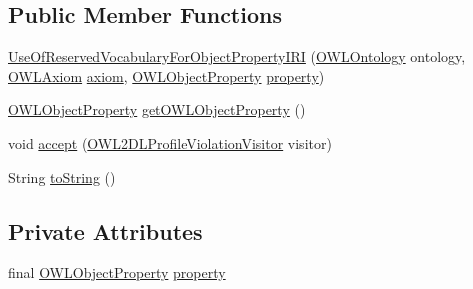 \subsection*{Public Member Functions}
\begin{DoxyCompactItemize}
\item 
\hyperlink{classorg_1_1semanticweb_1_1owlapi_1_1profiles_1_1_use_of_reserved_vocabulary_for_object_property_i_r_i_a142f91be66796a2785c34ff4a4d5ddae}{Use\-Of\-Reserved\-Vocabulary\-For\-Object\-Property\-I\-R\-I} (\hyperlink{interfaceorg_1_1semanticweb_1_1owlapi_1_1model_1_1_o_w_l_ontology}{O\-W\-L\-Ontology} ontology, \hyperlink{interfaceorg_1_1semanticweb_1_1owlapi_1_1model_1_1_o_w_l_axiom}{O\-W\-L\-Axiom} \hyperlink{classorg_1_1semanticweb_1_1owlapi_1_1profiles_1_1_o_w_l_profile_violation_aa7c8e8910ed3966f64a2c003fb516214}{axiom}, \hyperlink{interfaceorg_1_1semanticweb_1_1owlapi_1_1model_1_1_o_w_l_object_property}{O\-W\-L\-Object\-Property} \hyperlink{classorg_1_1semanticweb_1_1owlapi_1_1profiles_1_1_use_of_reserved_vocabulary_for_object_property_i_r_i_ab4e3f4edca6000d809a14ff228c35da3}{property})
\item 
\hyperlink{interfaceorg_1_1semanticweb_1_1owlapi_1_1model_1_1_o_w_l_object_property}{O\-W\-L\-Object\-Property} \hyperlink{classorg_1_1semanticweb_1_1owlapi_1_1profiles_1_1_use_of_reserved_vocabulary_for_object_property_i_r_i_a0669eaa5c277e16a22626f40a26e5ce5}{get\-O\-W\-L\-Object\-Property} ()
\item 
void \hyperlink{classorg_1_1semanticweb_1_1owlapi_1_1profiles_1_1_use_of_reserved_vocabulary_for_object_property_i_r_i_a1119bc8b1d2b8e054648028f2c848993}{accept} (\hyperlink{interfaceorg_1_1semanticweb_1_1owlapi_1_1profiles_1_1_o_w_l2_d_l_profile_violation_visitor}{O\-W\-L2\-D\-L\-Profile\-Violation\-Visitor} visitor)
\item 
String \hyperlink{classorg_1_1semanticweb_1_1owlapi_1_1profiles_1_1_use_of_reserved_vocabulary_for_object_property_i_r_i_aead1554c0721c69ae8e23ddaf615d736}{to\-String} ()
\end{DoxyCompactItemize}
\subsection*{Private Attributes}
\begin{DoxyCompactItemize}
\item 
final \hyperlink{interfaceorg_1_1semanticweb_1_1owlapi_1_1model_1_1_o_w_l_object_property}{O\-W\-L\-Object\-Property} \hyperlink{classorg_1_1semanticweb_1_1owlapi_1_1profiles_1_1_use_of_reserved_vocabulary_for_object_property_i_r_i_ab4e3f4edca6000d809a14ff228c35da3}{property}
\end{DoxyCompactItemize}


